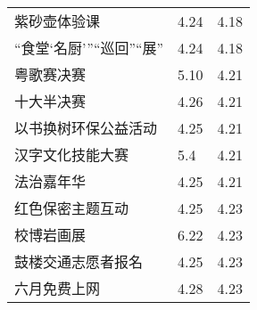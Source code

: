 \documentclass[letterpaper, 12pt]{article}
\begin{document}
\begin{multicols}{2}
{\begin{longtable}{|>{\centering\arraybackslash}m{}|m{}|m{}|}
    紫砂壶体验课 & 4.24 & 4.18\\
    “食堂‘名厨’”“巡回”“展” & 4.24 & 4.18\\
    粤歌赛决赛 & 5.10 & 4.21\\
    十大半决赛 & 4.26 & 4.21\\
    以书换树环保公益活动 & 4.25 & 4.21\\
    汉字文化技能大赛 & 5.4 & 4.21\\ 
    法治嘉年华 & 4.25 & 4.21\\
    红色保密主题互动 & 4.25 & 4.23\\
    校博岩画展 & 6.22 & 4.23\\
    鼓楼交通志愿者报名 & 4.25 & 4.23\\
    六月免费上网 & 4.28 & 4.23\\
    \hline
\end{longtable}
\unskip
\unpenalty
\unpenalty}\unvbox\colbbox
\end{multicols}
\end{document}
